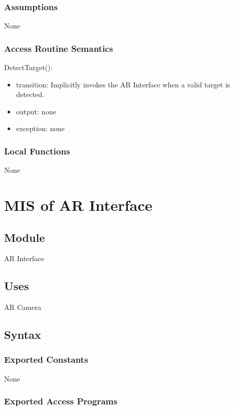 \documentclass[12pt, titlepage]{article}
\begin{document}
\subsubsection{Assumptions}

None

\subsubsection{Access Routine Semantics}

\noindent DetectTarget():
\begin{itemize}
\item transition: Implicitly invokes the AR Interface when a valid target is detected.
\item output: none
\item exception: none
\end{itemize}

\subsubsection{Local Functions}

None

\newpage

\section{MIS of AR Interface} \label{mARInterface}

\subsection{Module}

AR Interface

\subsection{Uses}

AR Camera

\subsection{Syntax}

\subsubsection{Exported Constants}

None

\subsubsection{Exported Access Programs}
\end{document}
